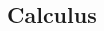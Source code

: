 \begin{multicols}{2}
{    }

    \MulticolsBreak

    \MulticolsPhantomPlaceholder

\end{multicols}


\newpage
\subsection{Calculus}%
\label{sub:calculus}

